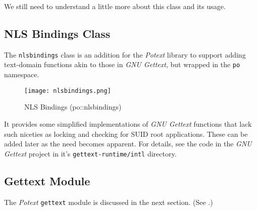    We still need to understand a little more about this class and its usage.

\subsection{NLS Bindings Class}
\label{subsec:potext_nlsbindings_class}

   The \texttt{nlsbindings} class is an addition for the \textsl{Potext}
   library to support adding text-domain functions akin to those in
   \textsl{GNU Gettext}, but wrapped in the \texttt{po} namespace.

\begin{figure}[H]
   \centering 
   \texttt{[image: nlsbindings.png]}
   \caption{NLS Bindings (po::nlsbindings)}
   \label{fig:nlsbindings}
\end{figure}

   It provides some simplified implementations of
   \textsl{GNU Gettext} functions that lack such niceties as
   locking and checking for SUID root applications.
   These can be added later as the need becomes apparent.
   For details, see the code in the 
   \textsl{GNU Gettext} project in it's
   \texttt{gettext-runtime/intl} directory.

\subsection{Gettext Module}
\label{subsec:potext_gettext_module}

   The \textsl{Potext} \texttt{gettext} module is discussed in the next
   section.
   (See .)

